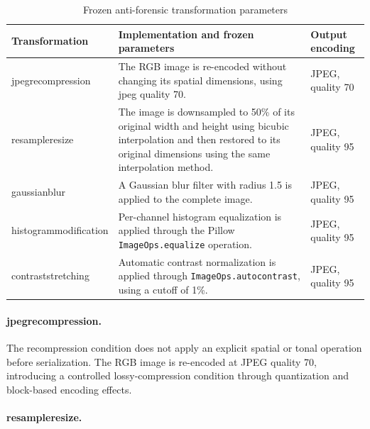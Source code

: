 \begin{table}[H]
\centering
\scriptsize
\renewcommand{\arraystretch}{1.18}
\setlength{\tabcolsep}{4pt}
\caption{Frozen anti-forensic transformation parameters}
\label{tab:implementation-antiforensic-parameters}
\begin{tabularx}{\textwidth}{@{}p{} X p{}@{}}
\toprule
\textbf{Transformation} &
\textbf{Implementation and frozen parameters} &
\textbf{Output encoding} \\
\midrule

\gls{jpegrecompression}
&
The RGB image is re-encoded without changing its spatial dimensions, using
\gls{jpeg} quality 70.
&
JPEG, quality 70 \\

\gls{resampleresize}
&
The image is downsampled to 50\% of its original width and height using bicubic
interpolation and then restored to its original dimensions using the same
interpolation method.
&
JPEG, quality 95 \\

\gls{gaussianblur}
&
A Gaussian blur filter with radius 1.5 is applied to the complete image.
&
JPEG, quality 95 \\

\gls{histogrammodification}
&
Per-channel histogram equalization is applied through the Pillow
\texttt{ImageOps.equalize} operation.
&
JPEG, quality 95 \\

\gls{contraststretching}
&
Automatic contrast normalization is applied through
\texttt{ImageOps.autocontrast}, using a cutoff of 1\%.
&
JPEG, quality 95 \\

\bottomrule
\end{tabularx}
\end{table}

\paragraph{\gls{jpegrecompression}.}

The recompression condition does not apply an explicit spatial or tonal
operation before serialization. The RGB image is re-encoded at JPEG quality 70,
introducing a controlled lossy-compression condition through quantization and
block-based encoding effects.

\paragraph{\gls{resampleresize}.}

